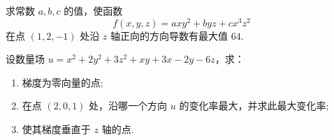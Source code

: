 	\begin{ti}
		求常数 $a,b,c$ 的值，使函数
		\[
			f(x,y,z) = axy^{2} + byz + cx^{3}z^{2}
		\]
		在点 $(1,2,-1)$ 处沿 $z$ 轴正向的方向导数有最大值 $64$.
	\end{ti}

	\begin{ti}
		设数量场 $u = x^{2} + 2y^{2} + 3z^{2} + xy + 3x - 2y - 6z$，求：
		\begin{enumerate}
			\item 梯度为零向量的点;
			\item 在点 $(2,0,1)$ 处，沿哪一个方向 $u$ 的变化率最大，并求此最大变化率;
			\item 使其梯度垂直于 $z$ 轴的点.
		\end{enumerate}
	\end{ti}